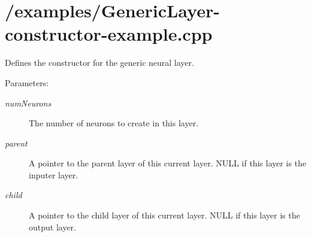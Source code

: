 \hypertarget{_2examples_2GenericLayer-constructor-example_8cpp-example}{
\section{/examples/Generic\-Layer-constructor-example.cpp}
}
Defines the constructor for the generic neural layer.

\begin{Desc}
\item[Parameters:]
\begin{description}
\item[{\em num\-Neurons}]The number of neurons to create in this layer. \item[{\em parent}]A pointer to the parent layer of this current layer. NULL if this layer is the inputer layer. \item[{\em child}]A pointer to the child layer of this current layer. NULL if this layer is the output layer.\end{description}
\end{Desc}


\begin{DocInclude}\begin{verbatim}\end{verbatim}
\end{DocInclude}
 